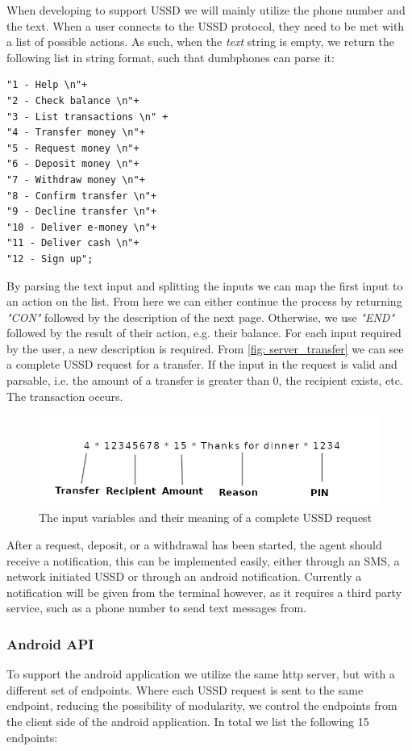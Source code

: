 \documentclass[11pt, a4paper]{article}
\begin{document}
When developing to support USSD we will mainly utilize the phone number and the text. When a user connects to the USSD protocol, they need to be met with a list of possible actions. As such, when the \textit{text} string is empty, we return the following list in string format, such that dumbphones can parse it:
\begin{lstlisting}
"1 - Help \n"+
"2 - Check balance \n"+
"3 - List transactions \n" +
"4 - Transfer money \n"+
"5 - Request money \n"+
"6 - Deposit money \n"+
"7 - Withdraw money \n"+
"8 - Confirm transfer \n"+
"9 - Decline transfer \n"+
"10 - Deliver e-money \n"+
"11 - Deliver cash \n"+
"12 - Sign up";
\end{lstlisting}

By parsing the text input and splitting the inputs we can map the first input to an action on the list. From here we can either continue the process by returning \textit{"CON"} followed by the description of the next page. Otherwise, we use \textit{"END"} followed by the result of their action, e.g. their balance. For each input required by the user, a new description is required. From \autoref{fig: server_transfer} we can see a complete USSD request for a transfer. If the input in the request is valid and parsable, i.e. the amount of a transfer is greater than 0, the recipient exists, etc. The transaction occurs.

\begin{figure}[ht]
\centering
\includegraphics[width=1\linewidth]{figs/transfer_desc.png}
\caption{The input variables and their meaning of a complete USSD request}
\label{fig: server_transfer}
\end{figure}

After a request, deposit, or a withdrawal has been started, the agent should receive a notification, this can be implemented easily, either through an SMS, a network initiated USSD or through an android notification. Currently a notification will be given from the terminal however, as it requires a third party service, such as a phone number to send text messages from.



\subsubsection{Android API}
To support the android application we utilize the same http server, but with a different set of endpoints. Where each USSD request is sent to the same endpoint, reducing the possibility of modularity, we control the endpoints from the client side of the android application. In total we list the following 15 endpoints:
\end{document}
